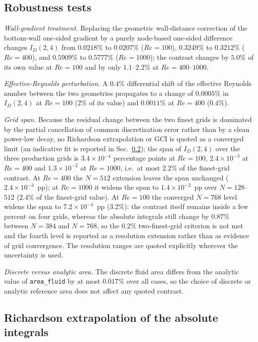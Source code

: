 \subsection{Robustness tests}

\emph{Wall-gradient treatment.} Replacing the geometric wall-distance correction of the bottom-wall one-sided gradient by a purely node-based one-sided difference changes $I_D(2,4)$ from $0.0218\%$ to $0.0207\%$ ($Re=100$), $0.3249\%$ to $0.3212\%$ ($Re=400$), and $0.5909\%$ to $0.5777\%$ ($Re=1000$); the contrast changes by $5.0\%$ of its own value at $Re=100$ and by only $1.1$--$2.2\%$ at $Re=400$--$1000$.

\emph{Effective-Reynolds perturbation.} A $0.4\%$ differential shift of the effective Reynolds number between the two geometries propagates to a change of $0.0005\%$ in $I_D(2,4)$ at $Re=100$ ($2\%$ of its value) and $0.0011\%$ at $Re=400$ ($0.4\%$).

\emph{Grid span.} Because the residual change between the two finest grids is dominated by the partial cancellation of common discretization error rather than by a clean power-law decay, no Richardson extrapolation or GCI is quoted as a converged limit (an indicative fit is reported in Sec.~\ref{suppsec:richardson}); the span of $I_D(2,4)$ over the three production grids is $3.4\times10^{-4}$ percentage points at $Re=100$, $2.4\times10^{-3}$ at $Re=400$ and $1.3\times10^{-2}$ at $Re=1000$, i.e.\ at most $2.2\%$ of the finest-grid contrast. At $Re=400$ the $N=512$ extension leaves the span unchanged ($2.4\times10^{-3}$~pp); at $Re=1000$ it widens the span to $1.4\times10^{-2}$~pp over $N=128$--$512$ ($2.4\%$ of the finest-grid value). At $Re=100$ the converged $N=768$ level widens the span to $7.2\times10^{-4}$~pp ($3.2\%$): the contrast itself remains inside a few percent on four grids, whereas the absolute integrals still change by $0.87\%$ between $N=384$ and $N=768$, so the $0.2\%$ two-finest-grid criterion is not met and the fourth level is reported as a resolution extension rather than as evidence of grid convergence. The resolution ranges are quoted explicitly wherever the uncertainty is used.

\emph{Discrete versus analytic area.} The discrete fluid area differs from the analytic value of \texttt{area\_fluid} by at most $0.017\%$ over all cases, so the choice of discrete or analytic reference area does not affect any quoted contrast.


\subsection{Richardson extrapolation of the absolute integrals}
\label{suppsec:richardson}


